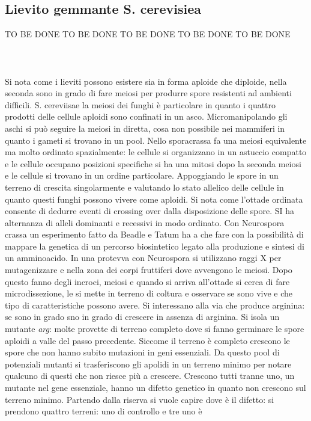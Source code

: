 \subsection{Lievito gemmante S. cerevisiea}
TO BE DONE TO BE DONE TO BE DONE TO BE DONE TO BE DONE\\\\\\\\
Si nota come i lieviti possono esistere sia in forma aploide che diploide, nella seconda sono in grado di fare meiosi per produrre spore resistenti ad ambienti difficili. S. 
cereviisae la meiosi dei funghi \`e particolare in quanto i quattro prodotti delle cellule aploidi sono confinati in un asco. Micromanipolando gli aschi si pu\`o seguire la meiosi
in diretta, cosa non possibile nei mammiferi in quanto i gameti si trovano in un pool. Nello sporacrassa fa una meiosi equivalente ma molto ordinato spazialmente: le cellule si 
organizzano in un astuccio compatto e le cellule occupano posizioni specifiche si ha una mitosi dopo la seconda meiosi e le cellule si trovano in un ordine particolare. Appoggiando 
le spore in un terreno di crescita singolarmente e valutando lo stato allelico delle cellule in quanto questi funghi possono vivere come aploidi. Si nota come l'ottade ordinata
consente di dedurre eventi di crossing over dalla disposizione delle spore. SI ha alternanza di alleli dominanti e recessivi in modo ordinato. Con Neurospora crassa un esperimento
fatto da Beadle e Tatum ha a che fare con la possibilit\`a di mappare la genetica di un percorso biosintetico legato alla produzione e sintesi di un amminoacido. In una protevva
con Neurospora si utilizzano raggi X per mutagenizzare e nella zona dei corpi fruttiferi dove avvengono le meiosi. Dopo questo fanno degli incroci, meiosi e quando si arriva 
all'ottade si cerca di fare microdissezione, le si mette in terreno di coltura e osservare se sono vive e che tipo di caratteristiche possono avere. Si interessano alla via che
produce arginina: se sono in grado sno in grado di crescere in assenza di arginina. Si isola un mutante \emph{arg}: molte provette di terreno completo dove si fanno germinare le
spore aploidi a valle del passo precedente. Siccome il terreno \`e completo crescono le spore che non hanno subito mutazioni in geni essenziali. Da questo pool di potenziali mutanti
si trasferiscono gli apolidi in un terreno minimo per notare qualcuno di questi che non riesce pi\`u a crescere. Crescono tutti tranne uno, un mutante nel gene essenziale, hanno un
difetto genetico in quanto non crescono sul terreno minimo. Partendo dalla riserva si vuole capire dove \`e il difetto: si prendono quattro terreni: uno di controllo e tre uno \`e
